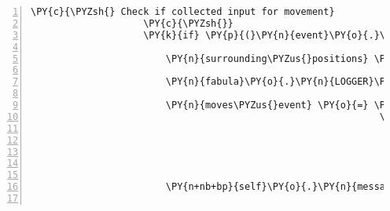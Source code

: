 \begin{Verbatim}[commandchars=\\\{\},numbers=left,firstnumber=1,stepnumber=1]
                    \PY{c}{\PYZsh{} Check if collected input for movement}
                    \PY{c}{\PYZsh{}}
                    \PY{k}{if} \PY{p}{(}\PY{n}{event}\PY{o}{.}\PY{n}{key} \PY{o+ow}{in} \PY{p}{(}\PY{n}{pygame}\PY{o}{.}\PY{n}{K\PYZus{}w}\PY{p}{,} \PY{n}{pygame}\PY{o}{.}\PY{n}{K\PYZus{}a}\PY{p}{,} \PY{n}{pygame}\PY{o}{.}\PY{n}{K\PYZus{}s}\PY{p}{,} \PY{n}{pygame}\PY{o}{.}\PY{n}{K\PYZus{}d}\PY{p}{)}\PY{p}{)}\PY{p}{:}

                        \PY{n}{surrounding\PYZus{}positions} \PY{o}{=} \PY{n}{fabula}\PY{o}{.}\PY{n}{surrounding\PYZus{}positions}\PY{p}{(}\PY{n+nb+bp}{self}\PY{o}{.}\PY{n}{host}\PY{o}{.}\PY{n}{room}\PY{o}{.}\PY{n}{entity\PYZus{}locations}\PY{p}{[}\PY{n+nb+bp}{self}\PY{o}{.}\PY{n}{host}\PY{o}{.}\PY{n}{client\PYZus{}id}\PY{p}{]}\PY{p}{)}

                        \PY{n}{fabula}\PY{o}{.}\PY{n}{LOGGER}\PY{o}{.}\PY{n}{debug}\PY{p}{(}\PY{l+s}{\PYZdq{}}\PY{l+s}{got key }\PY{l+s}{\PYZsq{}}\PY{l+s}{\PYZob{}\PYZcb{}}\PY{l+s}{\PYZsq{}}\PY{l+s}{ from user, returning TriesToMoveToEvent}\PY{l+s}{\PYZdq{}}\PY{o}{.}\PY{n}{format}\PY{p}{(}\PY{n}{event}\PY{o}{.}\PY{n}{key}\PY{p}{)}\PY{p}{)}

                        \PY{n}{moves\PYZus{}event} \PY{o}{=} \PY{n}{fabula}\PY{o}{.}\PY{n}{TriesToMoveEvent}\PY{p}{(}\PY{n+nb+bp}{self}\PY{o}{.}\PY{n}{host}\PY{o}{.}\PY{n}{client\PYZus{}id}\PY{p}{,}
                                                              \PY{p}{\PYZob{}}\PY{n}{pygame}\PY{o}{.}\PY{n}{K\PYZus{}w} \PY{p}{:} \PY{n}{surrounding\PYZus{}positions}\PY{p}{[}\PY{l+m+mi}{1}\PY{p}{]}\PY{p}{,}
                                                               \PY{n}{pygame}\PY{o}{.}\PY{n}{K\PYZus{}d} \PY{p}{:} \PY{n}{surrounding\PYZus{}positions}\PY{p}{[}\PY{l+m+mi}{3}\PY{p}{]}\PY{p}{,}
                                                               \PY{n}{pygame}\PY{o}{.}\PY{n}{K\PYZus{}s} \PY{p}{:} \PY{n}{surrounding\PYZus{}positions}\PY{p}{[}\PY{l+m+mi}{5}\PY{p}{]}\PY{p}{,}
                                                               \PY{n}{pygame}\PY{o}{.}\PY{n}{K\PYZus{}a} \PY{p}{:} \PY{n}{surrounding\PYZus{}positions}\PY{p}{[}\PY{l+m+mi}{7}\PY{p}{]}
                                                               \PY{p}{\PYZcb{}}\PY{p}{[}\PY{n}{event}\PY{o}{.}\PY{n}{key}\PY{p}{]}\PY{p}{)}

                        \PY{n+nb+bp}{self}\PY{o}{.}\PY{n}{message\PYZus{}for\PYZus{}host}\PY{o}{.}\PY{n}{event\PYZus{}list}\PY{o}{.}\PY{n}{append}\PY{p}{(}\PY{n}{moves\PYZus{}event}\PY{p}{)}


\end{Verbatim}
